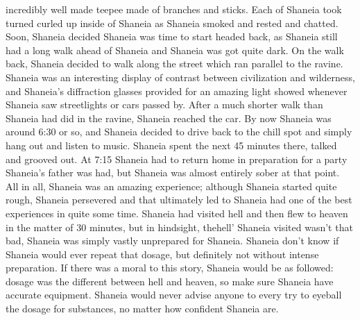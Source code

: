 \documentclass[12pt]{book}
\begin{document}
incredibly well made teepee made of branches and sticks. Each of Shaneia took turned curled up inside of Shaneia as Shaneia smoked and rested and chatted. Soon, Shaneia decided Shaneia was time to start headed back, as Shaneia still had a long walk ahead of Shaneia and Shaneia was got quite dark. On the walk back, Shaneia decided to walk along the street which ran parallel to the ravine. Shaneia was an interesting display of contrast between civilization and wilderness, and Shaneia's diffraction glasses provided for an amazing light showed whenever Shaneia saw streetlights or cars passed by. After a much shorter walk than Shaneia had did in the ravine, Shaneia reached the car. By now Shaneia was around 6:30 or so, and Shaneia decided to drive back to the chill spot and simply hang out and listen to music. Shaneia spent the next 45 minutes there, talked and grooved out. At 7:15 Shaneia had to return home in preparation for a party Shaneia's father was had, but Shaneia was almost entirely sober at that point. All in all, Shaneia was an amazing experience; although Shaneia started quite rough, Shaneia persevered and that ultimately led to Shaneia had one of the best experiences in quite some time. Shaneia had visited hell and then flew to heaven in the matter of 30 minutes, but in hindsight, thehell' Shaneia visited wasn't that bad, Shaneia was simply vastly unprepared for Shaneia. Shaneia don't know if Shaneia would ever repeat that dosage, but definitely not without intense preparation. If there was a moral to this story, Shaneia would be as followed: dosage was the different between hell and heaven, so make sure Shaneia have accurate equipment. Shaneia would never advise anyone to every try to eyeball the dosage for substances, no matter how confident Shaneia are.
\end{document}
